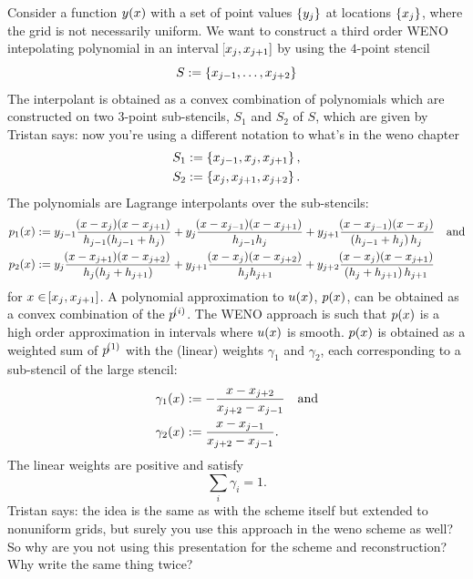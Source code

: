 \documentclass[final]{amsart}
\newcommand{\tristan}[1]{{\color{purple} Tristan says:  #1 }}
\numberwithin{equation}{section}
\begin{document}
Consider a function $y\!\left({x}\right)$ with a set of point values
$\left\lbrace y_j\right\rbrace$ at locations $\left\lbrace x_j\right\rbrace$, where the grid is not
necessarily uniform. We want to construct a third order WENO
intepolating polynomial in an interval $\!\left[{x_j, x_{j+1}}\right]$ by using
the $4$-point stencil
\begin{equation}
S:=\left\lbrace x_{j-1},\dots,x_{j+2}\right\rbrace
\end{equation}
 The interpolant is obtained as a convex combination of polynomials
 which are constructed on two 3-point sub-stencils, $S_1$ and $S_2$ of
 $S$, which are given by \tristan{now you're using a different
   notation to what's in the weno chapter}
\begin{equation}
\begin{aligned}
S_1 &:= \left\lbrace x_{j-1}, x_j, x_{j+1} \right\rbrace,\\
S_2& :=  \left\lbrace x_j, x_{j+1} , x_{j+2}\right\rbrace.
\end{aligned} 
\end{equation} 
The polynomials are  Lagrange interpolants over the sub-stencils:
\begin{equation}
\begin{aligned}
p_1\qp{x}&:= y_{j-1}\frac{\qp{x-x_{j}}\qp{x-x_{j+1}}}{h_{j-1}\qp{h_{j-1}+h_j}} + 
                                y_{j}\frac{\qp{x-x_{j-1}}\qp{x-x_{j+1}}}{h_{j-1}h_j}  +
                                y_{j+1}\frac{\qp{x-x_{j-1}}\qp{x-x_{j}}}{\qp{h_{j-1}+h_j}h_j}\quad\text{and} \\
p_2\qp{x}&:= y_{j}\frac{\qp{x-x_{j+1}}\qp{x-x_{j+2}}}{h_{j}\qp{h_{j}+h_{j+1}}} + 
							  y_{j+1}\frac{\qp{x-x_{j}}\qp{x-x_{j+2}}}{h_{j}h_{j+1}}  +
							  y_{j+2}\frac{\qp{x-x_{j}}\qp{x-x_{j+1}}}{\qp{h_{j}+h_{j+1}}h_{j+1}}
\end{aligned}
\end{equation}
for $x\in \!\left[{x_j, x_{j+1}}\right]$.  A polynomial approximation to
$u\!\left({x}\right)$, $p\!\left({x}\right)$, can be obtained as a convex combination of the
$p^{\!\left({i}\right)}$.  The WENO approach is such that $p\!\left({x}\right)$ is a high
order approximation in intervals where $u\!\left({x}\right)$ is smooth.  $p\!\left({x}\right)$
is obtained as a weighted sum of $p^{\!\left({1}\right)}$ with the (linear)
weights $\gamma_1$ and $\gamma_2$, each corresponding to a sub-stencil
of the large stencil:
\begin{equation}
\begin{aligned}
\gamma_1\!\left({x}\right)&:= -\frac{x-x_{j+2}}{x_{j+2}-x_{j-1}}\quad\text{and}\\
\gamma_2\!\left({x}\right)&:= \frac{x-x_{j-1}}{x_{j+2}-x_{j-1}}.
\end{aligned}
\end{equation}
The linear weights are positive and satisfy 
\begin{equation}
\sum_i \gamma_i = 1.
\end{equation}
\tristan{the idea is the same as with the scheme itself but extended
  to nonuniform grids, but surely you use this approach in the weno
  scheme as well? So why are you not using this presentation for the
  scheme and reconstruction? Why write the same thing twice?}
\end{document}
